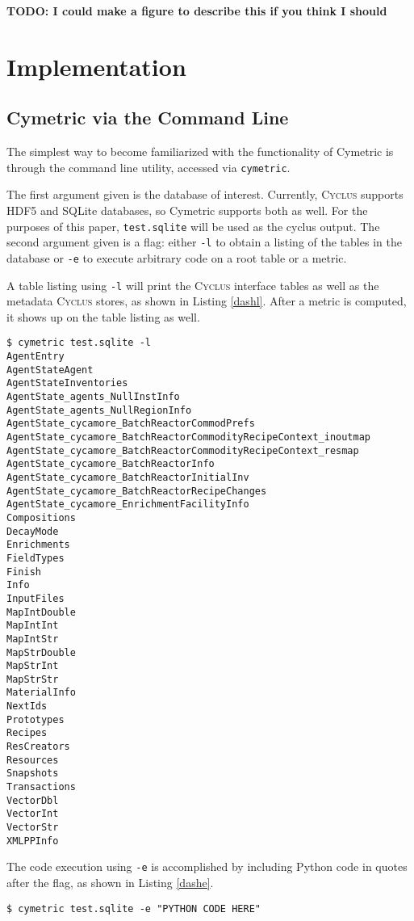 \documentclass{anstrans}
\newcommand{\cyclus}{\textsc{Cyclus}\xspace}
\newcommand{\TODO}[1] {{\color{red}\textbf{TODO: #1}}}
\newcommand{\code}[1]{{\color{code}\texttt{#1}}}
\begin{document}
\TODO{I could make a figure to describe this if you think I should}

\section{Implementation}

\subsection{Cymetric via the Command Line}
The simplest way to become familiarized with the functionality of Cymetric is through the command line utility, accessed via \code{cymetric}. 

The first argument given is the database of interest. Currently, \cyclus supports \gls{HDF5} and \gls{SQLite} databases, so Cymetric supports both as well. For the purposes of this paper, \code{test.sqlite} will be used as the cyclus output. The second argument given is a flag: either \code{-l} to obtain a listing of the tables in the database or \code{-e} to execute arbitrary code on a root table or a metric. 

A table listing using \code{-l} will print the \cyclus interface tables as well as the metadata \cyclus stores, as shown in Listing \ref{dashl}. After a metric is computed, it shows up on the table listing as well. 
\begin{lstlisting}[caption ={List of Tables in a Database}, label=dashl]
$ cymetric test.sqlite -l
AgentEntry
AgentStateAgent
AgentStateInventories
AgentState_agents_NullInstInfo
AgentState_agents_NullRegionInfo
AgentState_cycamore_BatchReactorCommodPrefs
AgentState_cycamore_BatchReactorCommodityRecipeContext_inoutmap
AgentState_cycamore_BatchReactorCommodityRecipeContext_resmap
AgentState_cycamore_BatchReactorInfo
AgentState_cycamore_BatchReactorInitialInv
AgentState_cycamore_BatchReactorRecipeChanges
AgentState_cycamore_EnrichmentFacilityInfo
Compositions
DecayMode
Enrichments
FieldTypes
Finish
Info
InputFiles
MapIntDouble
MapIntInt
MapIntStr
MapStrDouble
MapStrInt
MapStrStr
MaterialInfo
NextIds
Prototypes
Recipes
ResCreators
Resources
Snapshots
Transactions
VectorDbl
VectorInt
VectorStr
XMLPPInfo
\end{lstlisting}

The code execution using \code{-e} is accomplished by including Python code in quotes after the flag, as shown in Listing \ref{dashe}. 
\begin{lstlisting}[caption ={Executing Code on a Database}, label=dashe]
$ cymetric test.sqlite -e "PYTHON CODE HERE"
\end{lstlisting}
\end{document}
